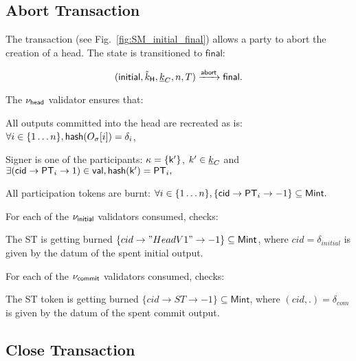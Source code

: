 \subsection{Abort Transaction}\label{sec:abort-tx}



The \mtxAbort{} transaction (see Fig.~\ref{fig:SM_initial_final}) allows a party
to abort the creation of a head. The state is transitioned to $\mathsf{final}$:

$$
   (\mathsf{initial},\tilde{k}_{\mathsf{H}},\underline{k}_C,n,T) \xrightarrow{\mathsf{abort}} \mathsf{final}.
$$

\noindent The $\nu_\mathsf{head}$ validator ensures that:
\begin{menumerate}
 \item All outputs committed into the head are recreated as is: $\forall i \in \{1\dots n\}, \mathsf{hash}(O_\sigma[i]) = \delta_i$,
  \item Signer is one of the participants: $\kappa = \{\mathsf{k'}\}$, $k' \in \underline{k}_C$ and
    $
    \exists (\mathsf{cid} \rightarrow \mathsf{PT}_i \rightarrow 1) \in \mathsf{val}, \mathsf{hash}(\mathsf{k'}) = \mathsf{PT}_i,
    $
 \item All participation tokens are burnt: $\forall i \in \{1\dots n\}, \{\mathsf{cid} \rightarrow \mathsf{PT}_i \rightarrow -1\} \subseteq \mathsf{Mint}.$
\end{menumerate} 

\noindent For each of the $\nu_\mathsf{initial}$ validators consumed, checks:
\begin{menumerate}
  \item The ST is getting burned
  $\{cid \rightarrow "HeadV1" \rightarrow -1\} \subseteq \mathsf{Mint}$, where
  $cid = \delta_{initial}$ is given by the datum of the spent initial output.
\end{menumerate}

\noindent For each of the $\nu_\mathsf{commit}$ validators consumed, checks:
\begin{menumerate}
  \item The ST token is getting burned
  $\{cid \rightarrow ST \rightarrow -1\} \subseteq \mathsf{Mint}$, where
  $(cid,.) = \delta_{com}$ is given by the datum of the spent commit output.
\end{menumerate}

\subsection{Close Transaction}\label{sec:close-tx}

